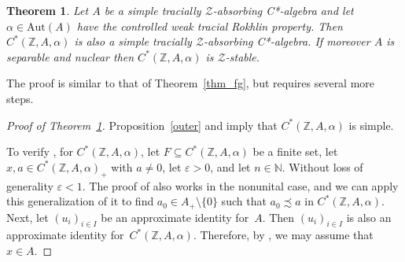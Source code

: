 \documentclass[11pt]{amsart}
\theoremstyle{plain}
\newtheorem{theorem}{Theorem}[section]
\theoremstyle{definition}
\theoremstyle{remark}
\numberwithin{equation}{section}
\newcommand{\ep}{\varepsilon}
\begin{document}
\begin{theorem}\label{thm_int}
Let $A$ be a simple tracially $\mathcal{Z}$-absorbing C*-algebra and let
$\alpha \in \mathrm{Aut} (A)$ have the controlled weak tracial
Rokhlin property.
Then $C^{*} (\mathbb{Z}, A, \alpha)$ is also a simple
tracially $\mathcal{Z}$-absorbing C*-algebra.
If moreover $A$ is separable and nuclear 
then   $C^{*} (\mathbb{Z}, A, \alpha)$ is $\mathcal{Z}$-stable.
\end{theorem}

The proof is similar to that of Theorem~\ref{thm_fg},
but requires several more steps.

\begin{proof}[Proof of Theorem~\ref{thm_int}]
Proposition~\ref{outer} and
\cite[Theorem 3.1]{Ki81}
imply that $C^{*} ({\mathbb{Z}}, A, \alpha)$ is simple.

To verify \cite[Definition~3.6]{AGJP21}, for $C^{*} ({\mathbb{Z}}, A, \alpha)$,
let $F \subseteq C^{*} ({\mathbb{Z}}, A, \alpha)$ be a finite set,
let $x, a \in C^{*} ({\mathbb{Z}}, A, \alpha)_{+}$ with $a \neq0$,
let $\varepsilon > 0$, and let $n \in \mathbb{N}$.
Without loss of generality $\ep < 1$.
The proof of \cite[Lemma~5.1]{HO13}
also works in the nonunital case,
and we can apply this generalization of it
to find $a_{0} \in A_{+} \setminus \{ 0 \}$
such that $a_{0} \precsim a$ in $C^{*} ({\mathbb{Z}}, A, \alpha)$.
Next,
let $(u_{i})_{i \in I}$ be an approximate identity for~$A$.
Then $(u_{i})_{i \in I}$ is also
an approximate identity for~$C^{*} ({\mathbb{Z}}, A, \alpha)$.
Therefore, by \cite[Remark~3.8]{AGJP21},
we may assume that $x \in A$.


\end{proof}
\end{document}
